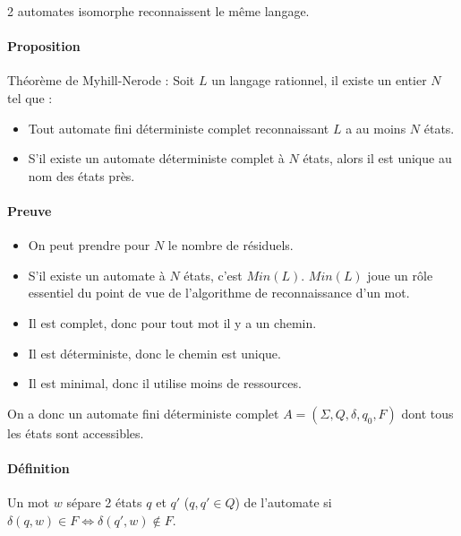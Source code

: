 2 automates isomorphe reconnaissent le même langage.



\paragraph{Proposition} %
\label{par:proposition}

Théorème de Myhill-Nerode : Soit $L$ un langage rationnel, il existe un entier $N$ tel que :

\begin{itemize}
	\item Tout automate fini déterministe complet reconnaissant $L$ a au moins $N$ états.
	\item S'il existe un automate déterministe complet à $N$ états, alors il est unique au nom des états près.
\end{itemize}



\paragraph{Preuve} %
\label{par:preuve}

\begin{itemize}
	\item On peut prendre pour $N$ le nombre de résiduels.
	\item S'il existe un automate à $N$ états, c'est $Min(L)$. $Min(L)$ joue un rôle essentiel du point de vue de l'algorithme de reconnaissance d'un mot.
	\item Il est complet, donc pour tout mot il y a un chemin.
	\item Il est déterministe, donc le chemin est unique.
	\item Il est minimal, donc il utilise moins de ressources.
\end{itemize}

On a donc un automate fini déterministe complet $A=(\Sigma,Q,\delta,q_0,F)$ dont tous les états sont accessibles.



\paragraph{Définition} %
\label{par:d_finition}

Un mot $w$ sépare 2 états $q$ et $q'$ ($q,q' \in Q$) de l'automate si $\delta(q,w) \in F \Leftrightarrow \delta(q',w) \not \in F$.

